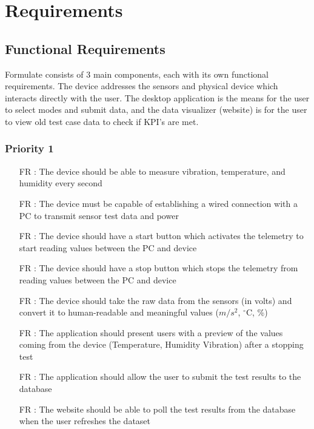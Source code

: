\documentclass[12pt]{article}
\newcounter{reqnum} %
\begin{document}
  \newpage

\section{Requirements}

\subsection{Functional Requirements}
Formulate consists of 3 main components, each with its own functional requirements. The device addresses the sensors and physical device which interacts directly with the user. The desktop application is the means for the user to select modes and submit data, and the data visualizer (website) is for the user to view old test case data to check if KPI's are met.



\subsubsection{Priority 1} 

\begin{itemize}
  
  \item[FR \refstepcounter{reqnum}\thereqnum:] The device should be able to measure vibration, temperature, and humidity every second
  
  \item[FR \refstepcounter{reqnum}\thereqnum:] The device must be capable of establishing a wired connection with a PC to transmit sensor test data and power
  
  \item[FR \refstepcounter{reqnum}\thereqnum:] The device should have a start button which activates the telemetry to start reading values between the PC and device 
  
  \item[FR \refstepcounter{reqnum}\thereqnum:] The device should have a stop button which stops the telemetry from reading values between the PC and device
  
  \item[FR \refstepcounter{reqnum}\thereqnum:] The device should take the raw data from the sensors (in volts) and convert it to human-readable and meaningful values ($m/s^2$, $^\circ$C, \%)
  
  \item[FR \refstepcounter{reqnum}\thereqnum:] The application should present users with a preview of the values coming from the device (Temperature, Humidity Vibration) after a stopping test

  \item[FR \refstepcounter{reqnum}\thereqnum:] The application should allow the user to submit the test results to the database
  
  \item[FR \refstepcounter{reqnum}\thereqnum:] The website should be able to poll the test results from the database when the user refreshes the dataset
  
  \end{itemize}
\end{document}
